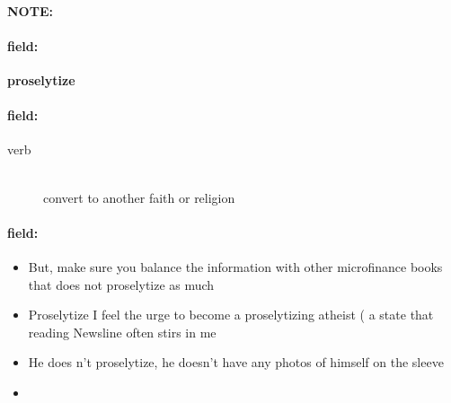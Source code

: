 \documentclass[12pt]{article}
\newenvironment{note}{\paragraph{NOTE:}}{}
\newenvironment{field}{\paragraph{field:}}{}
\begin{document}
\begin{note}
\begin{field}
\textbf{\large proselytize}
\end{field}


\begin{field}
\begin{description}
\item[verb] \hfill \\ 
convert to another faith or religion

\end{description}
\end{field}

\begin{field}
\begin{itemize}
\item But, make sure you balance the information with other microfinance books that does not proselytize as much
\item Proselytize I feel the urge to become a proselytizing atheist ( a state that reading Newsline often stirs in me
\item He does n't proselytize, he doesn't have any photos of himself on the sleeve
\item 
\end{itemize}
\end{field}
\end{note}
\end{document}
